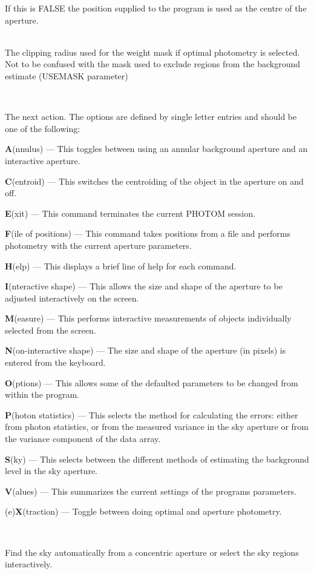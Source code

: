 \documentclass[twoside,11pt]{article}
\renewcommand{\_}{\texttt{\symbol{95}}}
\newcommand{\sstsubsection}[1]{ \item[{#1}] \mbox{} \\}
\newcommand{\sstsubsection}[1]{\item[{#1}]}
\begin{document}
{{{         If this is FALSE the position supplied to the program is used
         as the centre of the aperture.
      }
      \sstsubsection{
         CLIP = \_REAL (Read)
      }{
         The clipping radius used for the weight mask if optimal photometry
         is selected. Not to be confused with the mask used to exclude
         regions from the background estimate (USEMASK parameter)
      }  
      \sstsubsection{
         COMMAND = \_CHAR (Read)
      }{
         The next action. The options are
         defined by single letter entries and should be one of the
         following:
         \begin{description}
         \item \textbf{A}(nnulus) --- This toggles between using an annular background
              aperture and an interactive aperture.
         \item \textbf{C}(entroid) --- This switches the centroiding of the object in
              the aperture on and off.
         \item \textbf{E}(xit) --- This command terminates the current PHOTOM session.
         \item \textbf{F}(ile of positions) --- This command takes positions from a
              file and performs photometry with the current aperture
              parameters.
         \item \textbf{H}(elp) --- This displays a brief line of help for each command.
         \item \textbf{I}(nteractive shape) --- This allows the size and shape of the
              aperture to be adjusted interactively on the screen.
         \item \textbf{M}(easure) --- This performs interactive measurements of objects
              individually selected from the screen.
         \item \textbf{N}(on-interactive shape) --- The size and shape of
                       the  aperture (in pixels) is entered from the keyboard.
         \item \textbf{O}(ptions) --- This allows some of the defaulted parameters to
              be changed from within the program.
         \item \textbf{P}(hoton statistics) --- This selects the method for calculating
              the errors: either from photon statistics, or from the
              measured variance in the sky aperture or from the variance
              component of the data array.
         \item \textbf{S}(ky) --- This selects between the different methods of
              estimating the background level in the sky aperture.
         \item \textbf{V}(alues) --- This summarizes the current settings of the
              programs parameters.
         \item (e)\textbf{X}(traction) --- Toggle between doing optimal and aperture 
        photometry.   
         \end{description}
      }
      \sstsubsection{
         CONCEN = \_LOGICAL (Read)
      }{
         Find the sky automatically from a concentric aperture or
         select the sky regions interactively.

}}}
\end{document}
